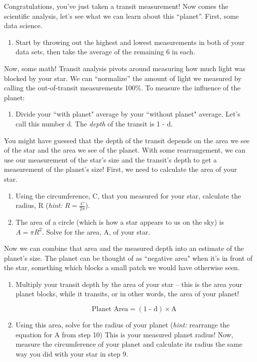 \documentclass[11pt]{article}
\begin{document}
\noindent
Congratulations, you’ve just taken a transit measurement! Now comes the scientific analysis, let’s see what we can learn about this “planet”. First, some data science. 
\begin{enumerate}[label=Step \arabic*:,resume]
    \item Start by throwing out the highest and lowest measurements in both of your data sets, then take the average of the remaining 6 in each.
\end{enumerate}

\medskip \noindent
Now, some math! Transit analysis pivots around measuring how much light was blocked by your star. We can “normalize” the amount of light we measured by calling the out-of-transit measurements 100\%. To measure the influence of the planet:
\begin{enumerate}[label=Step \arabic*:,resume]
    \item Divide your ``with planet" average by your ``without planet" average.  Let's call this number d.  The \textit{depth} of the transit is 1 - d.
\end{enumerate}

\noindent
You might have guessed that the depth of the transit depends on the area we see of the star and the area we see of the planet. With some rearrangement, we can use our measurement of the star’s size and the transit’s depth to get a measurement of the planet’s size! First, we need to calculate the area of your star.

\begin{enumerate}[label=Step \arabic*:,resume]
    \item Using the circumference, C, that you measured for your star, calculate the radius, R (\textit{hint: }$R = \frac{C}{2\pi}$).
    \item The area of a circle (which is how a star appears to us on the sky) is $A = \pi R^2$.  Solve for the area, A, of your star.
\end{enumerate}

\medskip \noindent
Now we can combine that area and the measured depth into an estimate of the planet's size. The planet can be thought of as ``negative area" when it's in front of the star, something which blocks a small patch we would have otherwise seen. 
\begin{enumerate}[label=Step \arabic*:,resume]
    \item Multiply your transit depth by the area of your star -- this is the area your planet blocks, while it transits, or in other words, the area of your planet!

    $$\text{Planet Area} = (\text{1 - d}) \times \text{A}$$
    
    \item Using this area, solve for the radius of your planet (\textit{hint: }rearrange the equation for A from step 10) This is your measured planet radius! Now, measure the circumference of your planet and calculate its radius the same way you did with your star in step 9.

\end{enumerate}
\end{document}
